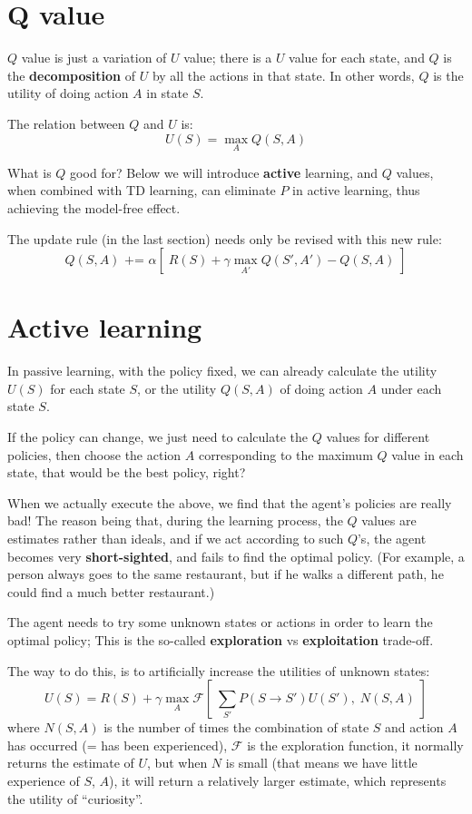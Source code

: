 \documentclass[orivec]{llncs}
\begin{document}
\section{Q value}

$Q$ value is just a variation of $U$ value;  there is a $U$ value for each state, and $Q$ is the \textbf{decomposition} of $U$ by all the actions in that state.  In other words, $Q$ is the utility of doing action $A$ in state $S$.

The relation between $Q$ and $U$ is:
$$ U(S) = \max_A  Q(S, A) $$

What is $Q$ good for?  Below we will introduce \textbf{active} learning, and $Q$ values, when combined with TD learning, can eliminate $P$ in active learning, thus achieving the model-free effect.

The update rule (in the last section) needs only be revised with this new rule:
$$ Q(S, A) \mbox{  +=  } \alpha [ \; R(S) + \gamma \max_{A'}  Q(S', A') - Q(S, A) \; ] $$

\section{Active learning}

In passive learning, with the policy fixed, we can already calculate the utility $U(S)$ for each state $S$, or the utility $Q(S,A)$ of doing action $A$ under each state $S$.

If the policy can change, we just need to calculate the $Q$ values for different policies, then choose the action $A$ corresponding to the maximum $Q$ value in each state, that would be the best policy, right?

When we actually execute the above, we find that the agent's policies are really bad!  The reason being that, during the learning process, the $Q$ values are estimates rather than ideals, and if we act according to such $Q$'s, the agent becomes very \textbf{short-sighted}, and fails to find the optimal policy.  (For example, a person always goes to the same restaurant, but if he walks a different path, he could find a much better restaurant.)

The agent needs to try some unknown states or actions in order to learn the optimal policy;  This is the so-called \textbf{exploration} vs \textbf{exploitation} trade-off.

The way to do this, is to artificially increase the utilities of unknown states:
$$ U(S) = R(S) + \gamma \max_A \mathcal{F}[ \; \sum_{S'} P(S \rightarrow S') U(S'), \; N(S, A) \; ] $$
where $N(S, A)$ is the number of times the combination of state $S$ and action $A$ has occurred (= has been experienced), $\mathcal{F}$ is the exploration function, it normally returns the estimate of $U$, but when $N$ is small (that means we have little experience of $S$, $A$), it will return a relatively larger estimate, which represents the utility of ``curiosity''.




%
\end{document}
